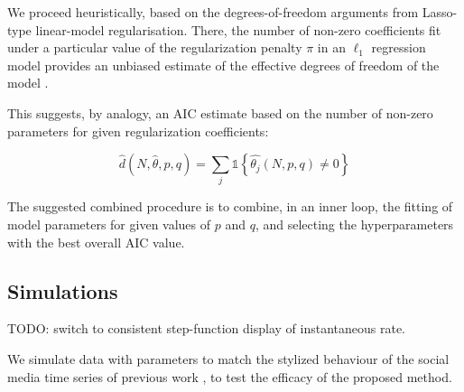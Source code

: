 \documentclass[11pt]{article}
\begin{document}
We proceed heuristically, based on the degrees-of-freedom arguments from
Lasso-type linear-model regularisation. There, the number of non-zero
coefficients fit under a particular value of the regularization penalty
\(\pi\) in an \(\ell_1\) regression model provides an unbiased estimate
of the effective degrees of freedom of the model
\cite{zou_degrees_2007}.

    This suggests, by analogy, an AIC estimate based on the number of
non-zero parameters for given regularization coefficients:

\[
\hat{d}\left(N,\hat{\theta},p,q\right)=\sum_j\mathbb 1\left\{\hat{\theta_j}(N,p,q)\neq 0\right\}
\]

    The suggested combined procedure is to combine, in an inner loop, the
fitting of model parameters for given values of \(p\) and \(q\), and
selecting the hyperparameters with the best overall AIC value.

    \subsection{Simulations}\label{simulations}

    TODO: switch to consistent step-function display of instantaneous rate.

    We simulate data with parameters to match the stylized behaviour of the
social media time series of previous work
\cite{crane_robust_2008,mitchell_hawkes_2010,rizoiu_expecting_2017}, to
test the efficacy of the proposed method.



    \begin{center}
    \end{center}
    { \hspace*{\fill} \\}
    
    \begin{center}
    \end{center}
    { \hspace*{\fill} \\}
    
    \begin{center}
    \end{center}
    { \hspace*{\fill} \\}
    
\end{document}
